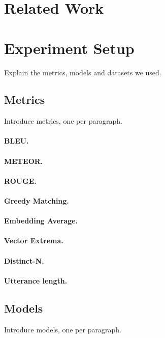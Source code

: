 \documentclass[runningheads]{llncs}
\begin{document}
    \section{Related Work}


    \section{Experiment Setup}
    Explain the metrics, models and datasets we used.

    \subsection{Metrics}
    Introduce metrics, one per paragraph.
    \paragraph{BLEU.}
    \paragraph{METEOR.}
    \paragraph{ROUGE.}

    \paragraph{Greedy Matching.}
    \paragraph{Embedding Average.}
    \paragraph{Vector Extrema.}

    \paragraph{Distinct-N.}
    \paragraph{Utterance length.}

    \subsection{Models}
    Introduce models, one per paragraph.
\end{document}
